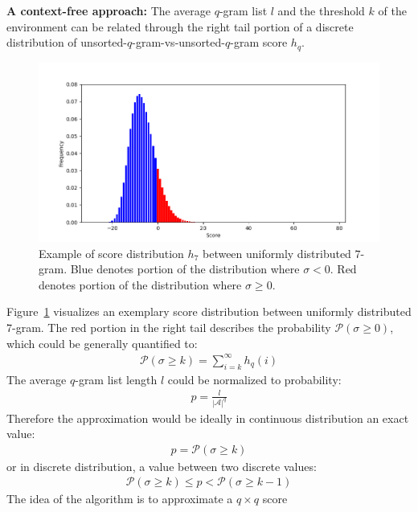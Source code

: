 \documentclass[twoside,a4paper,bsc]{master}
\newcommand{\Qgram}[1]{\(#1\)-gram}
\newcommand{\Alpha}[0]{\mathcal{A}}
\begin{document}
\textbf{A context-free approach:} The average \Qgram{q} list \(l\) and the
threshold \(k\) of the environment can be related through the right tail
portion of a discrete distribution of
unsorted-\Qgram{q}-vs-unsorted-\Qgram{q} score \(h_q\).
\begin{figure}[t]
\begin{center}
\includegraphics[scale=0.6]{graphics/distribution.png}
\end{center}
\caption{Example of score distribution \(h_7\) between uniformly
distributed \Qgram{7}. Blue denotes portion of the distribution where
\(\sigma < 0\). Red denotes portion of the distribution where \(\sigma \geq
0\).}
\label{fig:distrbution}
\end{figure}
Figure~\ref{fig:distrbution} visualizes an exemplary score distribution
between uniformly distributed \Qgram{7}. The red portion in the right
tail describes the probability \(\mathcal{P}(\sigma \geq 0)\), which could
be generally quantified to:
\begin{align}
\mathcal{P}(\sigma \geq k) = \sum_{i = k}^\infty h_q(i)
\end{align}
The average \Qgram{q} list length \(l\) could be normalized to
probability:
\begin{align}
p = \frac{l}{|\Alpha|^q}
\end{align}
Therefore the approximation would be ideally in continuous distribution an
exact value:
\begin{align}
p = \mathcal{P}(\sigma \geq k)
\end{align}
or in discrete distribution, a value between two discrete values:
\begin{align}
\mathcal{P}(\sigma \geq k) \leq p < \mathcal{P}(\sigma \geq
k-1)\label{eq:distribution}
\end{align}
The idea of the algorithm is to approximate a \(q\times q\) score
\end{document}
